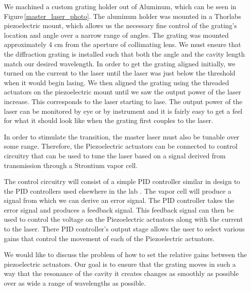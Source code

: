  We machined a custom grating holder out of Aluminum, which can be seen in Figure\,\ref{master_laser_photo}. The aluminum holder was mounted in a Thorlabs piezoelectric mount, which allows us the necessary fine control of the grating's location and angle over a narrow range of angles.  The grating was mounted approximately 4 cm from the aperture of collimating lens.
 We must ensure that the diffraction grating is installed such that both the angle and the cavity length match our desired wavelength. In order to get the grating aligned initially, we turned on the current to the laser until the laser was just below the threshold when it would begin lasing. We then aligned the grating using the threaded actuators on the piezoelectric mount until we saw the output power of the laser increase. This corresponds to the laser starting to lase. The output power of the laser can be monitored by eye or by instrument and it is fairly easy to get a feel for what it should look like when the grating first couples to the laser.

In order to stimulate the transition, the master laser must also be tunable over some range. Therefore, the Piezoelectric actuators can be connected to control circuitry that can be used to tune the laser based on a signal derived from transmission through a Strontium vapor cell. 

The control circuitry will consist of a simple PID controller similar in design to the PID controllers used elsewhere in the lab \cite{cjeDiss}. The vapor cell will produce a signal from which we can derive an error signal. The PID controller takes the error signal and produces a feedback signal. This feedback signal can then be used to control the voltage on the Piezoelectric actuators along with the current to the laser. There PID controller's output stage allows the user to select various gains that control the movement of each of the Piezoelectric actuators. 

We would like to discuss the problem of how to set the relative gains between the piezoelectric actuators. Our goal is to ensure that the grating moves in such a way that the resonance of the cavity it creates changes as smoothly as possible over as wide a range of wavelengths as possible. 

